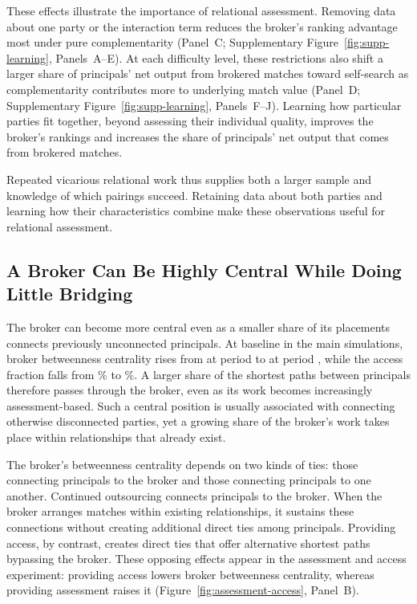 These effects illustrate the importance of relational assessment. Removing data about one party or the interaction term reduces the broker's ranking advantage most under pure complementarity (Panel~C; Supplementary Figure~\ref{fig:supp-learning}, Panels~A--E). At each difficulty level, these restrictions also shift a larger share of principals' net output from brokered matches toward self-search as complementarity contributes more to underlying match value (Panel~D; Supplementary Figure~\ref{fig:supp-learning}, Panels~F--J). Learning how particular parties fit together, beyond assessing their individual quality, improves the broker's rankings and increases the share of principals' net output that comes from brokered matches.

Repeated vicarious relational work thus supplies both a larger sample and knowledge of which pairings succeed. Retaining data about both parties and learning how their characteristics combine make these observations useful for relational assessment.

\subsection{A Broker Can Be Highly Central While Doing Little Bridging}

The broker can become more central even as a smaller share of its placements connects previously unconnected principals. At baseline in the main simulations, broker betweenness centrality rises from  at period  to  at period , while the access fraction falls from \% to \%. A larger share of the shortest paths between principals therefore passes through the broker, even as its work becomes increasingly assessment-based. Such a central position is usually associated with connecting otherwise disconnected parties, yet a growing share of the broker's work takes place within relationships that already exist.

The broker's betweenness centrality depends on two kinds of ties: those connecting principals to the broker and those connecting principals to one another. Continued outsourcing connects principals to the broker. When the broker arranges matches within existing relationships, it sustains these connections without creating additional direct ties among principals. Providing access, by contrast, creates direct ties that offer alternative shortest paths bypassing the broker. These opposing effects appear in the assessment and access experiment: providing access lowers broker betweenness centrality, whereas providing assessment raises it (Figure~\ref{fig:assessment-access}, Panel~B).

